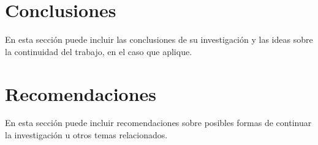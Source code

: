 \documentclass[a4paper,10pt,twocolumn]{article}
\begin{document}



\section{Conclusiones}\label{sec:conc}

  En esta sección puede incluir las conclusiones de su investigación y las ideas
  sobre la continuidad del trabajo, en el caso que aplique.




\section{Recomendaciones}\label{sec:rec}

  En esta sección puede incluir recomendaciones sobre posibles formas de continuar
  la investigación u otros temas relacionados.

\end{document}
